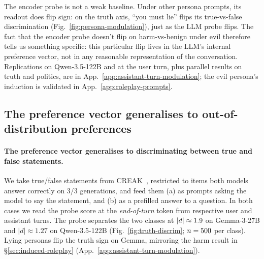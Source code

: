 \documentclass{article}
\begin{document}
The encoder probe is not a weak baseline. Under other persona prompts, its readout does flip sign: on the truth axis, ``you must lie'' flips its true-vs-false discrimination (Fig.~\ref{fig:persona-modulation}), just as the LLM probe flips. The fact that the encoder probe doesn't flip on harm-vs-benign under evil therefore tells us something specific: this particular flip lives in the LLM's internal preference vector, not in any reasonable representation of the conversation. Replications on Qwen-3.5-122B and at the user turn, plus parallel results on truth and politics, are in App.~\ref{app:assistant-turn-modulation}; the evil persona's induction is validated in App.~\ref{app:roleplay-prompts}.

\subsection{The preference vector generalises to out-of-distribution preferences}
\label{sec:induced-basic}
\paragraph{The preference vector generalises to discriminating between true and false statements.}
We take true/false statements from CREAK~\citep{onoe2021creak}, restricted to items both models answer correctly on 3/3 generations, and feed them (a) as prompts asking the model to say the statement, and (b) as a prefilled answer to a question. In both cases we read the probe score at the \textit{end-of-turn} token from respective user and assistant turns. The probe separates the two classes at $|d| \approx 1.9$ on Gemma-3-27B and $|d| \approx 1.27$ on Qwen-3.5-122B (Fig.~\ref{fig:truth-discrim}; $n = 500{}$ per class). Lying personas flip the truth sign on Gemma, mirroring the harm result in \S\ref{sec:induced-roleplay} (App.~\ref{app:assistant-turn-modulation}).
\end{document}
